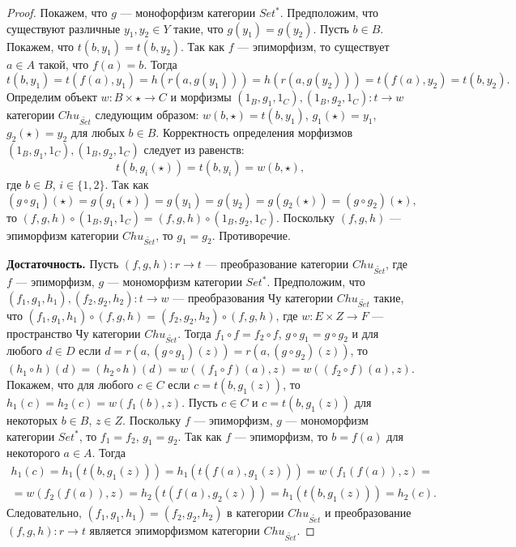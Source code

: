 \documentclass[a4paper,12pt]{article}
\begin{document}
\begin{proof}

    Покажем, что $g$ --- монофорфизм категории $Set^*$. Предположим, что существуют различные $y_1, y_2 \in Y$ такие, что $g(y_1) = g(y_2)$. Пусть $b \in B$. Покажем, что $t(b,y_1) = t(b,y_2)$. Так как $f$ --- эпиморфизм, то существует $a \in A$ такой, что $f(a) = b$. Тогда
    $$
        t(b,y_1) = t(f(a),y_1) = h(r(a,g(y_1))) = h(r(a,g(y_2))) = t(f(a),y_2) = t(b,y_2).
    $$
    Определим объект $w: B \times \star \to C$ и морфизмы $(1_B,g_1,1_C), (1_B,g_2,1_C): t \to w$ категории $Chu_{\widetilde{Set}}$ следующим образом: $w(b,\star) = t(b,y_1)$, $g_1(\star) = y_1$, $g_2(\star) = y_2$ для любых $b \in B$. Корректность определения морфизмов $(1_B,g_1,1_C), (1_B,g_2,1_C)$ следует из равенств:
    $$
        t(b,g_i(\star)) = t(b,y_i) = w(b,\star),
    $$
    где $b \in B$, $i \in \{1,2\}$. Так как
    $$
        (g \circ g_1)(\star) = g(g_1(\star)) = g(y_1) = g(y_2) = g(g_2(\star)) = (g \circ g_2)(\star),
    $$
    то $(f,g,h) \circ (1_B,g_1,1_C) = (f,g,h) \circ (1_B,g_2,1_C)$. Поскольку $(f,g,h)$ --- эпиморфизм категории $Chu_{\widetilde{Set}}$, то $g_1 = g_2$. Противоречие.

    \textbf{Достаточность.} Пусть $(f,g,h): r \to t$ --- преобразование категории $Chu_{\widetilde{Set}}$, где $f$ --- эпиморфизм, $g$ --- мономорфизм категории $Set^*$. Предположим, что $(f_1,g_1,h_1), (f_2,g_2,h_2): t \to w$ --- преобразования Чу категории $Chu_{\widetilde{Set}}$ такие, что $(f_1,g_1,h_1) \circ (f,g,h) = (f_2,g_2,h_2) \circ (f,g,h)$, где $w: E \times Z \to F$ --- пространство Чу категории $Chu_{\widetilde{Set}}$. Тогда $f_1 \circ f = f_2 \circ f$, $g \circ g_1 = g \circ g_2$ и для любого $d \in D$ если $d = r(a,(g \circ g_1)(z)) = r(a,(g \circ g_2)(z))$, то $(h_1 \circ h)(d) = (h_2 \circ h)(d) = w((f_1 \circ f)(a), z) = w((f_2 \circ f)(a), z)$. Покажем, что для любого $c \in C$ если $c = t(b,g_1(z))$, то $h_1(c) = h_2(c) = w(f_1(b),z)$. Пусть $c \in C$ и $c = t(b,g_1(z))$ для некоторых $b \in B$, $z \in Z$. Поскольку $f$ --- эпиморфизм, $g$ --- мономорфизм категории $Set^*$, то $f_1 = f_2$, $g_1 = g_2$. Так как $f$ --- эпиморфизм, то $b = f(a)$ для некоторого $a \in A$. Тогда 
    \begin{multline*}
        h_1(c) = h_1(t(b,g_1(z))) = h_1(t(f(a),g_1(z))) = w(f_1(f(a)),z) =\\=
        w(f_2(f(a)),z) = h_2(t(f(a),g_2(z))) = h_1(t(b,g_1(z))) = h_2(c).
    \end{multline*}
    Следовательно, $(f_1,g_1,h_1) = (f_2,g_2,h_2)$ в категории $Chu_{\widetilde{Set}}$ и преобразование $(f,g,h): r \to t$ является эпиморфизмом категории $Chu_{\widetilde{Set}}$.
\end{proof}
\end{document}
